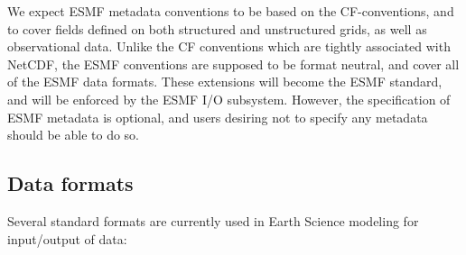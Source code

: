 
We expect ESMF metadata conventions to be based on the CF-conventions,
and to cover fields defined on both structured and unstructured grids,
as well as observational data. Unlike the CF conventions which are
tightly associated with NetCDF, the ESMF conventions are supposed to
be format neutral, and cover all of the ESMF data formats.  These
extensions will become the ESMF standard, and will be enforced by the
ESMF I/O subsystem. However, the specification of ESMF metadata is
optional, and users desiring not to specify any metadata should be
able to do so.



\subsection{Data formats}


Several standard formats are currently used in Earth Science modeling
for input/output of data:

